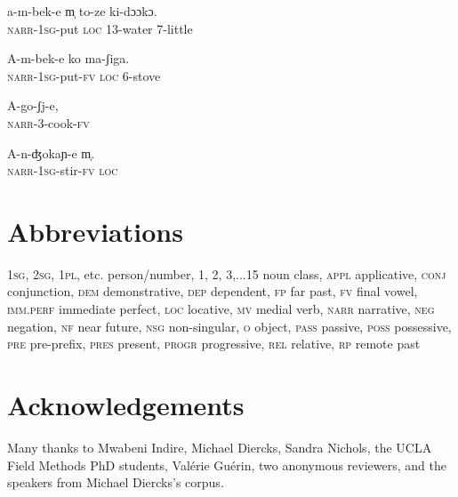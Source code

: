 \documentclass[output=paper]{LSP/langsci}
\begin{document}
 \begin{exe}
\ex \label{Saapp20}
\gll a-m-bek-e m̩ to-ze ki-dɔɔkɔ.\\
\textsc{narr}-\textsc{1sg}-put  \textsc{loc}  13-water  7-little\\
\glt {}
\end{exe}

 \begin{exe}
\ex \label{Saapp21}
\gll A-m-bek-e ko ma-ʃiga.\\
\textsc{narr}-\textsc{1sg}-put-\textsc{fv}  \textsc{loc}  6-stove\\
\glt {}
\end{exe}

 \begin{exe}
\ex \label{Saapp22}
\gll A-go-ʃj-e,\\
\textsc{narr}-3-cook-\textsc{fv}\\
\glt {}
\end{exe}

 \begin{exe}
\ex \label{Saapp23}
\gll A-n-ʤokaɲ-e m̩.\\
\textsc{narr}-\textsc{1sg}-stir-\textsc{fv}  \textsc{loc}\\
\glt {}
\end{exe}

\section*{Abbreviations}

\textsc{1sg, 2sg, 1pl}, etc.    person/number,
1, 2, 3,...15    noun class,
\textsc{appl}    applicative,
\textsc{conj}    conjunction,
\textsc{dem}    demonstrative,
\textsc{dep}    dependent,
\textsc{fp}     far past,
\textsc{fv}  final vowel,
\textsc{imm.perf}  immediate perfect,
\textsc{loc}     locative,
\textsc{mv}    medial verb,
\textsc{narr}   narrative,
\textsc{neg}     negation,
\textsc{nf}     near future,
\textsc{nsg}    non-singular,
\textsc{o}     object,
\textsc{pass}    passive,
\textsc{poss}     possessive,
\textsc{pre}     pre-prefix,
\textsc{pres}     present,
\textsc{progr}   progressive,
\textsc{rel}     relative,
\textsc{rp}     remote past


\section*{Acknowledgements}
Many thanks to Mwabeni Indire, Michael Diercks, Sandra Nichols, the UCLA Field Methods PhD students, Valérie Guérin, two anonymous reviewers, and the speakers from Michael Diercks’s corpus. 


\printbibliography[heading=subbibliography,notkeyword=this] 
\end{document}

